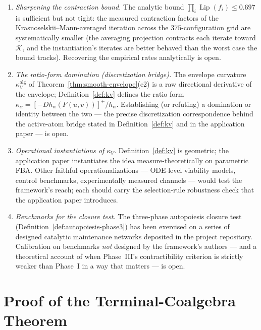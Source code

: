 \documentclass[11pt,a4paper]{article}
\theoremstyle{plain}
\theoremstyle{definition}
\theoremstyle{remark}
\newcommand{\kk}{\kappa_{\!V}}
\DeclareMathOperator{\Lip}{Lip}
\begin{document}
\begin{enumerate}[leftmargin=*,itemsep=3pt]
proof of Theorem~\ref{thm:hott-composition}, not constructed. An
explicit construction of $\infty$-categorical optics with its
coherence data, or a proof that no such construction exists under
the stated hypotheses, would close the most significant gap in
Section~\ref{sec:hott} (Remark~\ref{rem:proof-status-hott}).
\item \emph{Sharpening the contraction bound.} The analytic bound
$\prod_i \Lip(f_i) \leq 0.697$ is sufficient but not tight: the
measured contraction factors of the Krasnoselskii--Mann-averaged
iteration across the $375$-configuration grid are systematically
smaller (the averaging projection contracts each iterate toward
$\mathcal K$, and the instantiation's iterates are better behaved
than the worst case the bound tracks). Recovering the
empirical rates analytically is open.
\item \emph{The ratio-form domination (discretization bridge).}
The envelope curvature $\kk^{\mathrm{alg}}$ of
Theorem~\ref{thm:smooth-envelope}(e2) is a raw directional
derivative of the envelope; Definition~\ref{def:kv} defines the
ratio form $\kappa_\alpha = [-D h_\alpha(F(u,v))]^{+}/h_\alpha$.
Establishing (or refuting) a domination or identity between the
two --- the precise discretization correspondence behind the
active-atom bridge stated in Definition~\ref{def:kv} and in the
application paper \citep{zai2026measure} --- is open.
\item \emph{Operational instantiations of $\kk$.}
Definition~\ref{def:kv} is geometric; the application paper
\citep{zai2026measure} instantiates the idea measure-theoretically
on parametric FBA. Other faithful operationalizations --- ODE-level
viability models, control benchmarks, experimentally measured
channels --- would test the framework's reach; each should carry the selection-rule robustness check that the application paper introduces.
\item \emph{Benchmarks for the closure test.} The three-phase
autopoiesis closure test (Definition~\ref{def:autopoiesis-phase3})
has been exercised on a series of designed catalytic maintenance
networks deposited in the project repository. Calibration on
benchmarks \emph{not} designed by the framework's authors --- and a
theoretical account of when Phase~III's contractibility criterion is
strictly weaker than Phase~I in a way that matters --- is open.
\end{enumerate}


\appendix
\section{Proof of the Terminal-Coalgebra Theorem}
\label{app:terminal-coalgebra}
\end{document}
